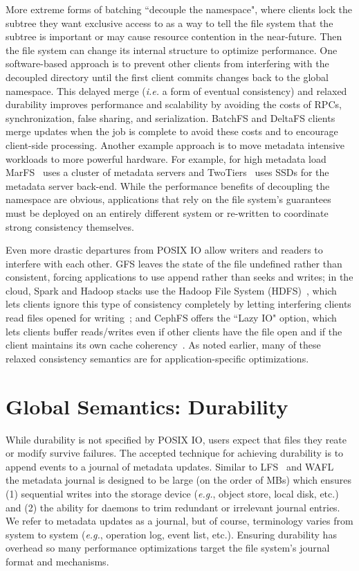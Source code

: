 More extreme forms of batching ``decouple the namespace", where clients lock
the subtree they want exclusive access to as a way to tell the file system that
the subtree is important or may cause resource contention in the near-future.
Then the file system can change its internal structure to optimize performance.
One software-based approach is to prevent other clients from interfering with
the decoupled directory until the first client commits changes back to the
global namespace. This delayed merge ({\it i.e.} a form of eventual
consistency) and relaxed durability improves performance and scalability by
avoiding the costs of RPCs, synchronization, false sharing, and serialization.
BatchFS and DeltaFS clients merge updates when the job is complete to avoid
these costs and to encourage client-side processing. Another example approach
is to move metadata intensive workloads to more powerful hardware. For example,
for high metadata load MarFS~\cite{grider:pdsw2015-marfs} uses a cluster of
metadata servers and TwoTiers~\cite{bent:slides-twotiers} uses SSDs for the
metadata server back-end.  While the performance benefits of decoupling the
namespace are obvious, applications that rely on the file system's guarantees
must be deployed on an entirely different system or re-written to coordinate
strong consistency themselves.  

Even more drastic departures from POSIX IO allow writers and readers to
interfere with each other. GFS leaves the state of the file undefined rather
than consistent, forcing applications to use append rather than seeks and
writes; in the cloud, Spark and Hadoop stacks use the Hadoop File System
(HDFS)~\cite{shvachko:msst10}, which lets clients ignore this type of
consistency completely by letting interfering clients read files opened for
writing~\cite{hakimzadeh:dais14-hdfs-consistency}; and CephFS offers the ``Lazy
IO" option, which lets clients buffer reads/writes even if other clients have
the file open and if the client maintains its own cache
coherency~\cite{docs:cephcaps}. As noted earlier, many of these relaxed
consistency semantics are for application-specific optimizations.

\section{Global Semantics: Durability}

While durability is not specified by POSIX IO, users expect that files they
reate or modify survive failures. The accepted technique for achieving
durability is to append events to a journal of metadata updates.  Similar to
LFS~\cite{rosenblum:acm1992-LFS} and WAFL~\cite{hitz:wtec1994-WAFL} the
metadata journal is designed to be large (on the order of MBs) which ensures
(1) sequential writes into the storage device ({\it e.g.}, object store, local
disk, etc.) and (2) the ability for daemons to trim redundant or irrelevant
journal entries. We refer to metadata updates as a journal, but of course,
terminology varies from system to system ({\it e.g.}, operation log, event
list, etc.). Ensuring durability has overhead so many performance optimizations
target the file system's journal format and mechanisms.

